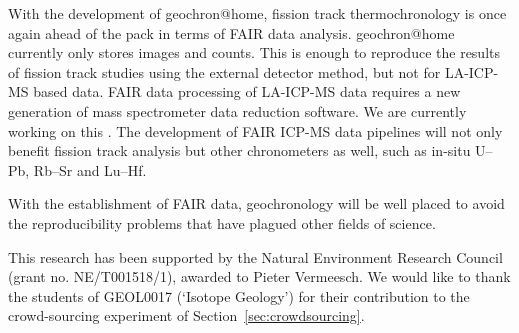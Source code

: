 \documentclass[gchron, manuscript]{copernicus}
\begin{document}
With the development of geochron@home, fission track thermochronology
is once again ahead of the pack in terms of FAIR data analysis.
geochron@home currently only stores images and counts. This is enough
to reproduce the results of fission track studies using the external
detector method, but not for LA-ICP-MS based data. FAIR data
processing of LA-ICP-MS data requires a new generation of mass
spectrometer data reduction software. We are currently working on this
\citep{vermeesch2025b}. The development of FAIR ICP-MS data pipelines
will not only benefit fission track analysis but other chronometers as
well, such as in-situ U--Pb, Rb--Sr and Lu--Hf.\medskip

With the establishment of FAIR data, geochronology will be well placed
to avoid the reproducibility problems that have plagued other fields
of science.





\begin{acknowledgements}
This research has been supported by the Natural Environment Research
Council (grant no. NE/T001518/1), awarded to Pieter Vermeesch. We would like
to thank the students of GEOL0017 (`Isotope Geology') for their contribution
to the crowd-sourcing experiment of Section~\ref{sec:crowdsourcing}.
\end{acknowledgements}
\end{document}
